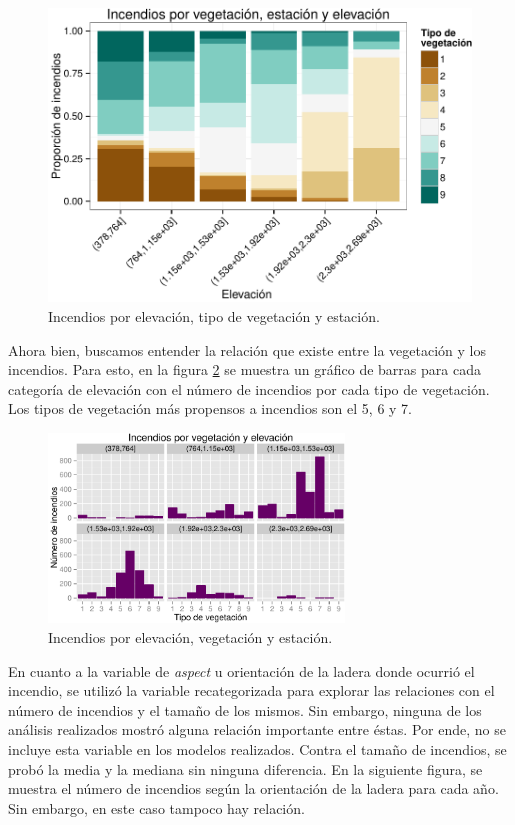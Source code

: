 \documentclass[12,]{article}
\begin{document}
\begin{figure}[H]
\centering
\includegraphics{tarea2_files/figure-latex/unnamed-chunk-6-1.pdf}
\caption{Incendios por elevación, tipo de vegetación y estación.}
\label{vegetacion}
\end{figure}

Ahora bien, buscamos entender la relación que existe entre la vegetación
y los incendios. Para esto, en la figura \ref{elevveg} se muestra un
gráfico de barras para cada categoría de elevación con el número de
incendios por cada tipo de vegetación. Los tipos de vegetación más
propensos a incendios son el 5, 6 y 7.

\begin{figure}[H]
\centering
\includegraphics[width=0.7\textwidth]{tarea2_files/figure-latex/unnamed-chunk-7-1.pdf}
\caption{Incendios por elevación, vegetación y estación.}
\label{elevveg}
\end{figure}

En cuanto a la variable de \emph{aspect} u orientación de la ladera
donde ocurrió el incendio, se utilizó la variable recategorizada para
explorar las relaciones con el número de incendios y el tamaño de los
mismos. Sin embargo, ninguna de los análisis realizados mostró alguna
relación importante entre éstas. Por ende, no se incluye esta variable
en los modelos realizados. Contra el tamaño de incendios, se probó la
media y la mediana sin ninguna diferencia. En la siguiente figura, se
muestra el número de incendios según la orientación de la ladera para
cada año. Sin embargo, en este caso tampoco hay relación.
\end{document}
